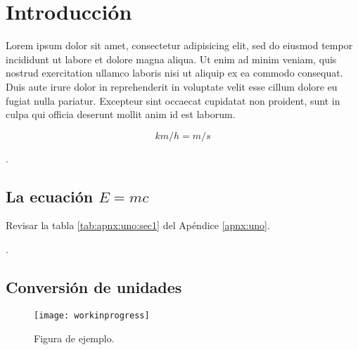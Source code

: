 \chapter{Introducción}
Lorem ipsum dolor sit amet, consectetur adipisicing elit, sed do eiusmod tempor incididunt ut labore et dolore magna aliqua. Ut enim ad minim veniam, quis nostrud exercitation ullamco laboris nisi ut aliquip ex ea commodo consequat. Duis aute irure dolor in reprehenderit in voluptate velit esse cillum dolore eu fugiat nulla pariatur. Excepteur sint occaecat cupidatat non proident, sunt in culpa qui officia deserunt mollit anim id est laborum\citep{ejemplo01}.


\begin{equation*}
  \si{km\per h = m\per s}
\end{equation*}

\lipsum[2]\cite{ejemplo02}.

\section{La ecuación \texorpdfstring{$E=mc$}{E=mc}}
\lipsum[3]

\lipsum[4] Revisar la tabla \ref{tab:apnx:uno:sec1} del Apéndice \ref{apnx:uno}.

\lipsum[5-6]\citep{Dan,Baz}.

\section{Conversión de unidades}%
\lipsum[7]

\begin{figure}[!h]
  \center
  \texttt{[image: workinprogress]}
  \caption{Figura de ejemplo.}
  \label{fig:ejemplo1}
\end{figure}

\lipsum[8-9]

